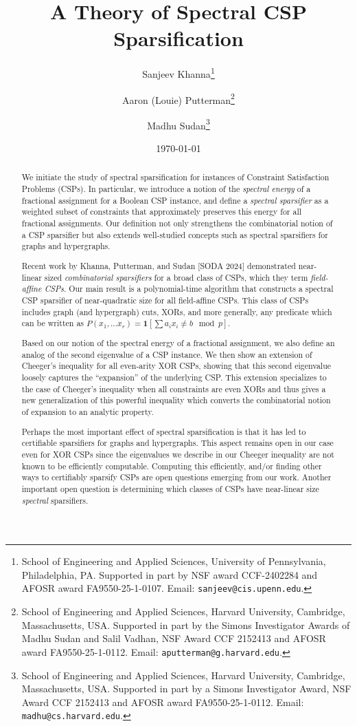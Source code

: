 \documentclass[11pt]{article}
\title{A Theory of Spectral CSP Sparsification}
\date{\today}
\author{Sanjeev Khanna\thanks{School of Engineering and Applied Sciences, University of Pennsylvania, Philadelphia, PA. Supported in part by NSF award CCF-2402284 and AFOSR award FA9550-25-1-0107. Email: {\tt sanjeev@cis.upenn.edu}. } \and Aaron (Louie) Putterman\thanks{School of Engineering and Applied Sciences, Harvard University, Cambridge, Massachusetts, USA. Supported in part by the Simons Investigator Awards of Madhu Sudan and Salil Vadhan, NSF Award CCF 2152413 and AFOSR award FA9550-25-1-0112. Email: \texttt{aputterman@g.harvard.edu}.} \and Madhu Sudan\thanks{School of Engineering and Applied Sciences, Harvard University, Cambridge, Massachusetts, USA. Supported in part by a Simons Investigator Award, NSF Award CCF 2152413 and AFOSR award FA9550-25-1-0112. Email: \texttt{madhu@cs.harvard.edu}.}}
\theoremstyle{definition}
\begin{document}
\maketitle

\begin{abstract}
We initiate the study of spectral sparsification for instances of Constraint Satisfaction Problems (CSPs). In particular, we introduce a notion of the \emph{spectral energy} of a fractional assignment for a Boolean CSP instance, and define a \emph{spectral sparsifier} as a weighted subset of constraints that approximately preserves this energy for all fractional assignments. Our definition not only strengthens the combinatorial notion of a CSP sparsifier but also extends well-studied concepts such as spectral sparsifiers for graphs and hypergraphs.

Recent work by Khanna, Putterman, and Sudan [SODA 2024] demonstrated near-linear sized \emph{combinatorial sparsifiers} for a broad class of CSPs, which they term \emph{field-affine CSPs}. Our main result is a polynomial-time algorithm that constructs a spectral CSP sparsifier of near-quadratic size for all field-affine CSPs. This class of CSPs includes graph (and hypergraph) cuts, XORs, and more generally, any predicate which can be written as $P(x_1, \dots x_r) = \mathbf{1}[\sum a_i x_i \neq b \mod p]$.

   Based on our notion of the spectral energy of a fractional assignment, we also define an analog of the second eigenvalue of a CSP instance. We then show an extension of Cheeger's inequality for all even-arity XOR CSPs, showing that this second eigenvalue loosely captures the ``expansion'' of the underlying CSP. This extension specializes to the case of Cheeger's inequality when all constraints are even XORs and thus gives a new generalization of this powerful inequality which converts the combinatorial notion of expansion to an analytic property.

   Perhaps the most important effect of spectral sparsification is that it has led to certifiable sparsifiers for graphs and hypergraphs. This aspect remains open in our case even for XOR CSPs since the eigenvalues we describe in our Cheeger inequality are not known to be efficiently computable. Computing this efficiently, and/or finding other ways to certifiably sparsify CSPs are open questions emerging from our work. Another important open question is determining which classes of CSPs have near-linear size \emph{spectral} sparsifiers.
\end{abstract}
\end{document}
